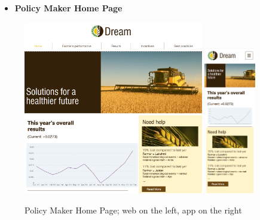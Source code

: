 \documentclass{article}
\begin{document}
    \begin{itemize}
        \item \textbf{Policy Maker Home Page}
    \end{itemize}
        \begin{figure} [h]
            \centering
            \includegraphics[width=0.7\textwidth]{images/UserInterfaces/PolicyMaker/PolicyMakerHomePageWeb.png}
            \quad
            \includegraphics[width=0.2\textwidth]{images/UserInterfaces/PolicyMaker/PolicyMakerHomePageApp.png}
            \quad
            \caption{\label{fig:policyMakerHomePage}Policy Maker Home Page; web on the left, app on the right}
        \end{figure}
    
    
    \newpage
    
\end{document}
